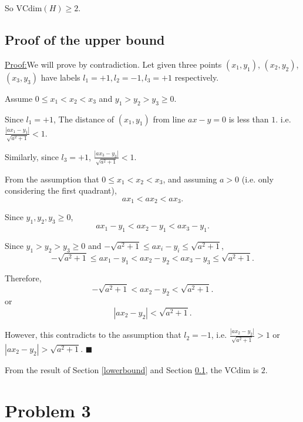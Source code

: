 \documentclass[11pt]{article}
\newenvironment{claim}[1]{\par\noindent\underline{Claim:}\space#1}{}
\newenvironment{claimproof}[1]{\par\noindent\underline{Proof:}\space#1}{\hfill $\blacksquare$}
\begin{document}
So $\mbox{VCdim}(H) \geq 2$.

\subsection{Proof of the upper bound}
\label{upperbound}


\begin{claimproof}
We will prove by contradiction. Let given three points $(x_1, y_1)$, $(x_2, y_2)$, $(x_3, y_3)$ have labels ${l_1 = +1, l_2 = -1, l_3 = +1}$ respectively.

Assume $0 \leq x_1 < x_2 < x_3$ and $y_1 > y_2 > y_3 \geq 0$.

Since $l_1 = +1$, The distance of $(x_1, y_1)$ from line $ax - y = 0$ is less than $1$. i.e. $\frac{|ax_1 - y_1|}{\sqrt{a^2 + 1}} < 1$.

Similarly, since $l_3 = +1$, $\frac{|ax_3 - y_3|}{\sqrt{a^2 + 1}} < 1$.

From the assumption that $0 \leq x_1 < x_2 < x_3$, and assuming $a > 0$ (i.e. only considering the first quadrant), $$ax_1 < ax_2 < ax_3.$$ 

Since $y_1, y_2, y_3 \geq 0$, $$ax_1 - y_1 < ax_2 - y_1 < ax_3 - y_1.$$

Since $y_1 > y_2 > y_3 \geq 0$ and $-\sqrt{a^2 + 1} \leq ax_i - y_i \leq \sqrt{a^2 + 1}$, 
$$ -\sqrt{a^2 + 1} \leq ax_1 - y_1 < ax_2 - y_2 < ax_3 - y_3 \leq \sqrt{a^2 + 1}.$$

Therefore,
$$ -\sqrt{a^2 + 1} < ax_2 - y_2 < \sqrt{a^2 + 1}.$$
or
$$ |ax_2 - y_2| < \sqrt{a^2 + 1}.$$

However, this contradicts to the assumption that $l_2 = -1$, i.e. $\frac{|ax_2 - y_2|}{\sqrt{a^2 + 1}} > 1$ or $|ax_2 - y_2| > \sqrt{a^2 + 1}$.
\end{claimproof}

From the result of Section \ref{lowerbound} and Section \ref{upperbound}, the VCdim is $2$.


\section{Problem 3}
\end{document}
